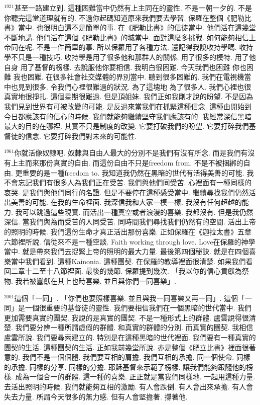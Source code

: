 \documentclass{book}
\begin{document}
$^{1921}$甚至一路建立到.
這種困難當中仍然有上主同在的靈性.
不是一朝一夕的.
不是你聽完這堂道理就有的.
不過你起碼知道原來我們要去學習.
保羅在整個《肥勒比書》當中.
也很明白這不是簡單的事.
在《肥勒比書》的信徒當中.
他們活在這幾堂不斷地講.
他們活在這個《肥勒比書》的城當中.
面對這麼多挑戰.
如何能夠相信上帝同在呢.
不是一件簡單的事.
所以保羅用了各種方法.
還記得我說收持學嗎.
收持學不只是一種技巧.
收持學是用了很多他和那群人的關係.
用了很多的模特.
用了他自身 用了基督的榜樣.
去說服他你要相信.
我明白很困難.
今天我們也困難 你也困難 我也困難.
在很多社會社交媒體的界別當中.
聽到很多困難的.
我們在電視機當中也見到很多.
令我們心裡很難過的狀況.
為了這塊地 為了很多人.
我們心裡也很真實地很掙扎.
這個星期很難過.
但是頂姐妹.
我們正如我剛才說的盼望.
不是因為我們見到世界有可被改變的可能.
是反過來當我們在抓緊這種信念.
這種由開始到今日都應該有的信心的時候.
我們就能夠繼續堅守我們應該有的.
我經常深信黑暗最大的目的在哪裡.
其實不只是制度的改變.
它要打破我們的盼望.
它要打碎我們基督徒的信念.
它要打碎我們對未來的可能性.

$^{1961}$你就活像奴隸吧.
奴隸與自由人最大的分別不是我們有沒有所念.
而是我們有沒有上主而來那份真實的自由.
而這份自由不只是freedom from.
不是不被捆綁的自由.
更重要的是一種freedom to.
我知道我仍然在黑暗的世代有活得美善的可能.
我不會忘記我們有很多人為我們正在受苦.
我們與他們同受苦.
心裡面有一種同樣的哀哭.
是我們與他們同行的名證.
但是不要停在這種感受當中.
繼續尋找我們仍然活出美善的可能.
在我的生命裡面.
我深信我和大家一模一樣.
我沒有任何超越的能力.
我可以跳過這些現實.
而活出一種真空或者浪漫的喜樂.
我都沒有.
但是我仍然深信.
當我們與為而受苦的人同受苦.
同時間我們尋找我們仍然有的空間.
活出上帝的照明的時候.
我們這份生命才真正活出那份喜樂.
正如保羅在《迦拉太書》五章六節裡所說.
信從來不是一種空談.
Faith working through love.
Love在保羅的神學當中.
就是帶來我們去捉緊上帝的照明的最大力量.
最後第四個秘訣.
就是在四個喜樂當中我們看到.
這種Kainonia.
這種團契.
在保羅的教導裡面很清楚.
如果我們看回二章十二至十八節裡面.
最後的幾節.
保羅提到幾次.
「我以你的信心貢獻為祭物.
我若被囂獻在其上也時喜樂.
並且與你們一同喜樂」.

$^{2001}$這個「一同」.
「你們也要照樣喜樂.
並且與我一同喜樂又再一同」.
這個「一同」是一個很重要的基督徒的靈性.
我們要相信我們在一個黑暗的世代當中.
我們更加需要真實的團契.
我說的是真實的團契.
不是一種形式上的群體.
盧雲說得很清楚.
我們要分辨一種所謂虛假的群體.
和真實的群體的分別.
而真實的團契.
我相信盧雲所說.
我們要尋索建立的.
特別是在這種黑暗的世代裡面.
我們要有一種真實的團契的生活.
這種團契的生活.
正如我前幾堂所說.
亦是整個《肥立比書》裡面很著意的.
我們不是一個個體.
我們要互相的肩擔.
我們互相的承擔.
同一個使命.
同樣的承擔.
同樣的分享.
同樣的分擔.
耶穌基督來示範了榜樣.
讓我們能夠跟隨他的榜樣.
成為一個合一的群體.
這一種的喜樂.
正正就是當我們同樣地.
一起用這種力量.
去活出照明的時候.
我們就能夠互相的激勵.
有人會跌倒.
有人會出來承擔.
有人會失去力量.
所謂今天很多的無力感.
但有人會堅擔著.
撐著他.
\end{document}
